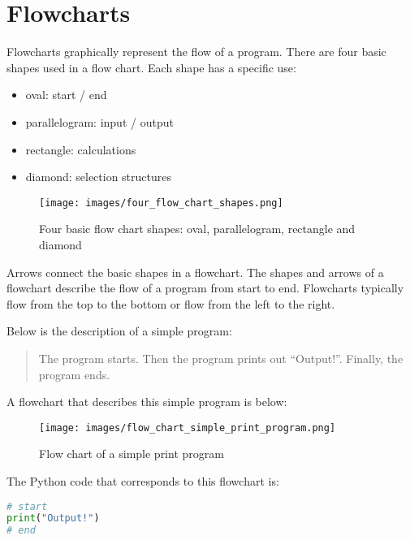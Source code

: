 \documentclass{book}
\makeatletter
\def\maxwidth{\ifdim\Gin@nat@width>\linewidth\linewidth
\else\Gin@nat@width\fi}
\let\Oldincludegraphics\includegraphics
\renewcommand{\includegraphics}[1]{\Oldincludegraphics[width=.8\maxwidth]{#1}}
\providecommand{\tightlist}{%
      \setlength{\itemsep}{0pt}\setlength{\parskip}{0pt}}
\makeatother
\begin{document}
    
        \hypertarget{flowcharts}{%
\section{Flowcharts}\label{flowcharts}}
    




    
        Flowcharts graphically represent the flow of a program. There are four
basic shapes used in a flow chart. Each shape has a specific use:

\begin{itemize}
\tightlist
\item
  oval: start / end
\item
  parallelogram: input / output
\item
  rectangle: calculations
\item
  diamond: selection structures
\end{itemize}

\begin{figure}
\centering
\texttt{[image: images/four\_flow\_chart\_shapes.png]}
\caption{Four basic flow chart shapes: oval, parallelogram, rectangle
and diamond}
\end{figure}

Arrows connect the basic shapes in a flowchart. The shapes and arrows of
a flowchart describe the flow of a program from start to end. Flowcharts
typically flow from the top to the bottom or flow from the left to the
right.
    




    
        Below is the description of a simple program:

\begin{quote}
The program starts. Then the program prints out ``Output!''. Finally,
the program ends.
\end{quote}

A flowchart that describes this simple program is below:

\begin{figure}
\centering
\texttt{[image: images/flow\_chart\_simple\_print\_program.png]}
\caption{Flow chart of a simple print program}
\end{figure}

The Python code that corresponds to this flowchart is:

\begin{lstlisting}[language=Python]
# start
print("Output!")
# end
\end{lstlisting}
    
\end{document}
